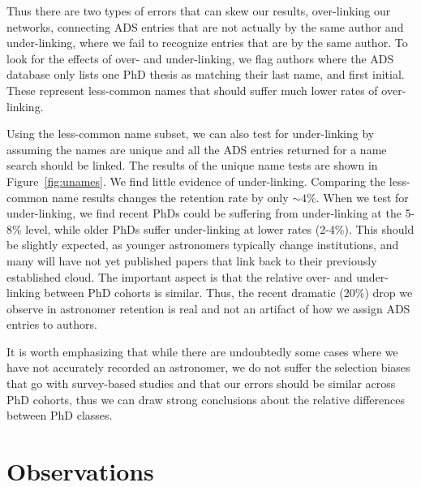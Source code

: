 \documentclass{emulateapj}
\begin{document}
Thus there are two types of errors that can skew our results, over-linking our networks, connecting ADS entries that are not actually by the same author and under-linking, where we fail to recognize entries that are by the same author.  To look for the effects of over- and under-linking, we flag authors where the ADS database only lists one PhD thesis as matching their last name, and first initial. These represent less-common names that should suffer much lower rates of over-linking.

Using the less-common name subset, we can also test for under-linking by assuming the names are unique and all the ADS entries returned for a name search should be linked.  The results of the unique name tests are shown in Figure~\ref{fig:unames}. We find little evidence of under-linking. Comparing the less-common name results changes the retention rate by only $\sim4$\%. When we test for under-linking, we find recent PhDs could be suffering from under-linking at the 5-8\% level, while older PhDs suffer under-linking at lower rates (2-4\%).  This should be slightly expected, as younger astronomers typically change institutions, and many will have not yet published papers that link back to their previously established cloud.  The important aspect is that the relative over- and under-linking between PhD cohorts is similar.  Thus, the recent dramatic (20\%) drop we observe in astronomer retention is real and not an artifact of how we assign ADS entries to authors.



It is worth emphasizing that while there are undoubtedly some cases where we have not accurately recorded an astronomer, we do not suffer the selection biases that go with survey-based studies and that our errors should be similar across PhD cohorts, thus we can draw strong conclusions about the relative differences between PhD classes.

\section{Observations}
\end{document}
